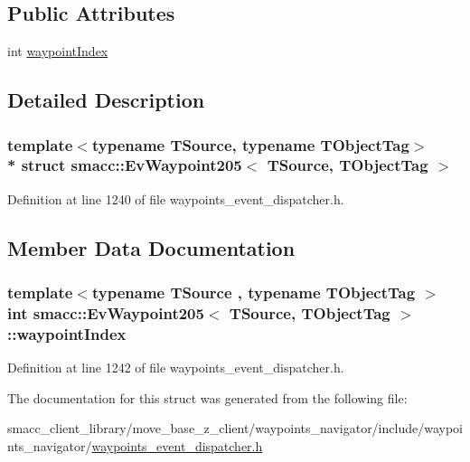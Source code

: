 \subsection*{Public Attributes}
\begin{DoxyCompactItemize}
\item 
int \hyperlink{structsmacc_1_1EvWaypoint205_adb42bec3e8553b8097b6a3e4cab8c468}{waypoint\+Index}
\end{DoxyCompactItemize}


\subsection{Detailed Description}
\subsubsection*{template$<$typename T\+Source, typename T\+Object\+Tag$>$\\*
struct smacc\+::\+Ev\+Waypoint205$<$ T\+Source, T\+Object\+Tag $>$}



Definition at line 1240 of file waypoints\+\_\+event\+\_\+dispatcher.\+h.



\subsection{Member Data Documentation}
\subsubsection[{\texorpdfstring{waypoint\+Index}{waypointIndex}}]{\setlength{\rightskip}{0pt plus 5cm}template$<$typename T\+Source , typename T\+Object\+Tag $>$ int {\bf smacc\+::\+Ev\+Waypoint205}$<$ T\+Source, T\+Object\+Tag $>$\+::waypoint\+Index}\hypertarget{structsmacc_1_1EvWaypoint205_adb42bec3e8553b8097b6a3e4cab8c468}{}\label{structsmacc_1_1EvWaypoint205_adb42bec3e8553b8097b6a3e4cab8c468}


Definition at line 1242 of file waypoints\+\_\+event\+\_\+dispatcher.\+h.



The documentation for this struct was generated from the following file\+:\begin{DoxyCompactItemize}
\item 
smacc\+\_\+client\+\_\+library/move\+\_\+base\+\_\+z\+\_\+client/waypoints\+\_\+navigator/include/waypoints\+\_\+navigator/\hyperlink{waypoints__event__dispatcher_8h}{waypoints\+\_\+event\+\_\+dispatcher.\+h}\end{DoxyCompactItemize}
